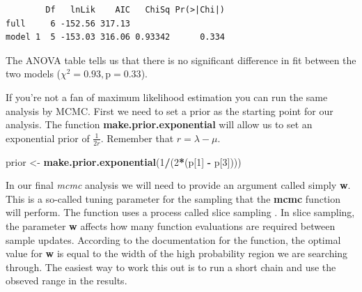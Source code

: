\documentclass[
]{book}
\newenvironment{Shaded}{\begin{snugshade}}{\end{snugshade}}
\newcommand{\DataTypeTok}[1]{\textcolor[rgb]{0.13,0.29,0.53}{#1}}
\newcommand{\DecValTok}[1]{\textcolor[rgb]{0.00,0.00,0.81}{#1}}
\newcommand{\KeywordTok}[1]{\textcolor[rgb]{0.13,0.29,0.53}{\textbf{#1}}}
\newcommand{\NormalTok}[1]{#1}
\newcommand{\OperatorTok}[1]{\textcolor[rgb]{0.81,0.36,0.00}{\textbf{#1}}}
\newcommand{\StringTok}[1]{\textcolor[rgb]{0.31,0.60,0.02}{#1}}
\begin{document}
\begin{verbatim}
        Df   lnLik    AIC   ChiSq Pr(>|Chi|)
full     6 -152.56 317.13                   
model 1  5 -153.03 316.06 0.93342      0.334
\end{verbatim}

The ANOVA table tells us that there is no significant difference in fit between the two models (\(\chi^{2} = 0.93, \text{p} = 0.33\)).

If you're not a fan of maximum likelihood estimation you can run the same analysis by MCMC. First we need to set a prior as the starting point for our analysis. The function \textbf{make.prior.exponential} will allow us to set an exponential prior of \(\frac{1}{2r}\). Remember that \(r = \lambda - \mu\).

\begin{Shaded}
\begin{Highlighting}[]
\NormalTok{prior \textless{}{-}}\StringTok{ }\KeywordTok{make.prior.exponential}\NormalTok{(}\DecValTok{1}\OperatorTok{/}\NormalTok{(}\DecValTok{2}\OperatorTok{*}\NormalTok{(p[}\DecValTok{1}\NormalTok{] }\OperatorTok{{-}}\StringTok{ }\NormalTok{p[}\DecValTok{3}\NormalTok{])))}
\end{Highlighting}
\end{Shaded}

In our final \emph{mcmc} analysis we will need to provide an argument called simply \textbf{w}. This is a so-called tuning parameter for the sampling that the \textbf{mcmc} function will perform. The function uses a process called slice sampling \citep{Neal03}. In slice sampling, the parameter \textbf{w} affects how many function evaluations are required between sample updates. According to the documentation for the function, the optimal value for \textbf{w} is equal to the width of the high probability region we are searching through. The easiest way to work this out is to run a short chain and use the obseved range in the results.

\begin{Shaded}
\end{Shaded}
\end{document}
